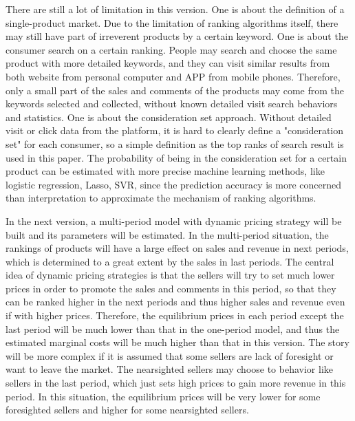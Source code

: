 \documentclass{article}
\begin{document}
There are still a lot of limitation in this version. One is about the definition of a single-product market. Due to the limitation of ranking algorithms itself, there may still have part of irreverent products by a certain keyword. One is about the consumer search on a certain ranking. People may search and choose the same product with more detailed keywords, and they can visit similar results from both website from personal computer and APP from mobile phones. Therefore, only a small part of the sales and comments of the products may come from the keywords selected and collected, without known detailed visit search behaviors and statistics. One is about the consideration set approach. Without detailed visit or click data from the platform, it is hard to clearly define a "consideration set" for each consumer, so a simple definition as the top ranks of search result is used in this paper. The probability of being in the consideration set for a certain product can be estimated with more precise machine learning methods, like logistic regression, Lasso, SVR, since the prediction accuracy is more concerned than interpretation to approximate the mechanism of ranking algorithms. 

In the next version, a multi-period model with dynamic pricing strategy will be built and its parameters will be estimated. In the multi-period situation, the rankings of products will have a large effect on sales and revenue in next periods, which is determined to a great extent by the sales in last periods. The central idea of dynamic pricing strategies is that the sellers will try to set much lower prices in order to promote the sales and comments in this period, so that they can be ranked higher in the next periods and thus higher sales and revenue even if with higher prices. Therefore, the equilibrium prices in each period except the last period will be much lower than that in the one-period model, and thus the estimated marginal costs will be much higher than that in this version. The story will be more complex if it is assumed that some sellers are lack of foresight or want to leave the market. The nearsighted sellers may choose to behavior like sellers in the last period, which just sets high prices to gain more revenue in this period. In this situation, the equilibrium prices will be very lower for some foresighted sellers and higher for some nearsighted sellers. 




\newpage

\nocite{*}
%

\end{document}
